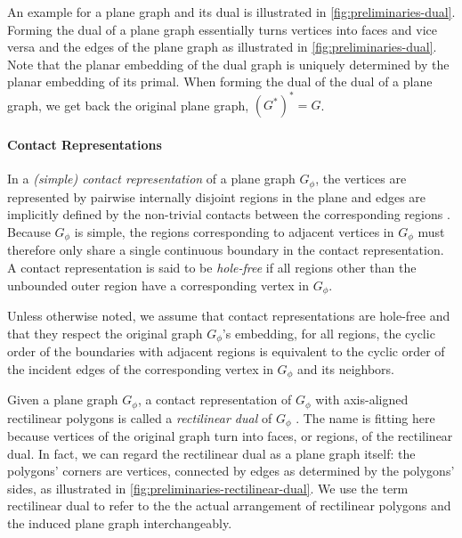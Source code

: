 An example for a plane graph and its dual is illustrated in \cref{fig:preliminaries-dual}.
Forming the dual of a plane graph essentially turns vertices into faces and vice versa and  the edges of the plane graph as illustrated in \cref{fig:preliminaries-dual}.
Note that the planar embedding of the dual graph is uniquely determined by the planar embedding of its primal.
When forming the dual of the dual of a plane graph, we get back the original plane graph, \ie{} $(G^*)^* = G$.



\paragraph{Contact Representations}

In a \emph{(simple) contact representation} of a plane graph $G_\phi$, the vertices are represented by pairwise internally disjoint regions in the plane and edges are implicitly defined by the non-trivial contacts between the corresponding regions \cite{alam2013linear}.
Because $G_\phi$ is simple, the regions corresponding to adjacent vertices in $G_\phi$ must therefore only share a single continuous boundary in the contact representation.
A contact representation is said to be \emph{hole-free} if all regions other than the unbounded outer region have a corresponding vertex in $G_\phi$.

Unless otherwise noted, we assume that contact representations are hole-free and that they respect the original graph $G_\phi$'s embedding, \ie{} for all regions, the cyclic order of the boundaries with adjacent regions is equivalent to the cyclic order of the incident edges of the corresponding vertex in $G_\phi$ and its neighbors.

Given a plane graph $G_\phi$, a contact representation of $G_\phi$ with axis-aligned rectilinear polygons is called a \emph{rectilinear dual} of $G_\phi$ \cite{alam2013computing}.
The name  is fitting here because vertices of the original graph turn into faces, or regions, of the rectilinear dual.
In fact, we can regard the rectilinear dual as a plane graph itself: the polygons' corners are vertices, connected by edges as determined by the polygons' sides, as illustrated in \cref{fig:preliminaries-rectilinear-dual}.
We use the term rectilinear dual to refer to the the actual arrangement of rectilinear polygons and the induced plane graph interchangeably.

